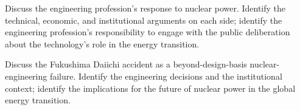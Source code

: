 \begin{exercise}
Discuss the engineering profession's response to nuclear power. Identify the technical, economic, and institutional arguments on each side; identify the engineering profession's responsibility to engage with the public deliberation about the technology's role in the energy transition.
\end{exercise}

\begin{exercise}
Discuss the Fukushima Daiichi accident as a beyond-design-basis nuclear-engineering failure. Identify the engineering decisions and the institutional context; identify the implications for the future of nuclear power in the global energy transition.
\end{exercise}
